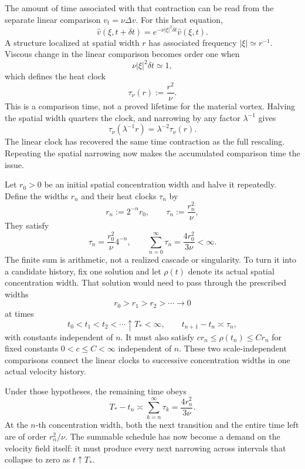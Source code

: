 
The amount of time associated with that contraction can be read from the separate linear comparison \(v_t=\nu\Delta v\). For this heat equation,
\[
  \widehat v(\xi,t+\delta t)
  =
  e^{-\nu|\xi|^2\delta t}\widehat v(\xi,t).
\]
A structure localized at spatial width \(r\) has associated frequency \(|\xi|\simeq r^{-1}\). Viscous change in the linear comparison becomes order one when
\[
  \nu|\xi|^2\delta t\simeq1,
\]
which defines the heat clock
\[
  \tau_\nu(r)
  :=
  \frac{r^2}{\nu}.
\]
This is a comparison time, not a proved lifetime for the material vortex. Halving the spatial width quarters the clock, and narrowing by any factor \(\lambda^{-1}\) gives
\[
  \tau_\nu(\lambda^{-1}r)
  =
  \lambda^{-2}\tau_\nu(r).
\]
The linear clock has recovered the same time contraction as the full \NavierStokes{} rescaling. Repeating the spatial narrowing now makes the accumulated comparison time the issue.


Let \(r_0>0\) be an initial spatial concentration width and halve it repeatedly. Define the widths \(r_n\) and their heat clocks \(\tau_n\) by
\[
  r_n:=2^{-n}r_0,
  \qquad
  \tau_n:=\frac{r_n^2}{\nu},
\]
They satisfy
\[
  \tau_n
  =
  \frac{r_0^2}{\nu}4^{-n},
  \qquad
  \sum_{n=0}^{\infty}\tau_n
  =
  \frac{4r_0^2}{3\nu}
  <
  \infty.
\]
The finite sum is arithmetic, not a realized cascade or singularity. To turn it into a candidate history, fix one \NavierStokes{} solution and let \(\rho(t)\) denote its actual spatial concentration width. That solution would need to pass through the prescribed widths
\[
  r_0>r_1>r_2>\cdots\longrightarrow0
\]
at times
\[
  t_0<t_1<t_2<\cdots\uparrow T_*<\infty,
  \qquad
  t_{n+1}-t_n\asymp\tau_n,
\]
with constants independent of \(n\). It must also satisfy \(c r_n\leq\rho(t_n)\leq C r_n\) for fixed constants \(0<c\leq C<\infty\) independent of \(n\). These two scale-independent comparisons connect the linear clocks to successive concentration widths in one actual velocity history.

Under those hypotheses, the remaining time obeys
\[
  T_*-t_n
  \asymp
  \sum_{k=n}^{\infty}\tau_k
  =
  \frac{4r_n^2}{3\nu}.
\]
At the \(n\)-th concentration width, both the next transition and the entire time left are of order \(r_n^2/\nu\). The summable schedule has now become a demand on the velocity field itself: it must produce every next narrowing across intervals that collapse to zero as \(t\uparrow T_*\).

